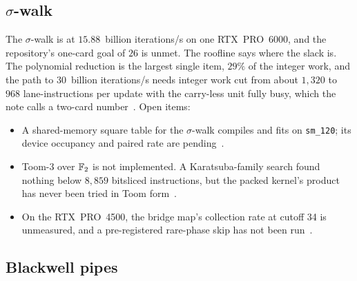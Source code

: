 \subsection{$\sigma$-walk}
\label{sec:open-sigma}

The $\sigma$-walk is at $15.88$~billion iterations/s on one RTX~PRO~6000,
and the repository's one-card goal of $26$ is unmet. The roofline says
where the slack is. The polynomial reduction is the largest single
item, $29\%$ of the integer work, and the path to $30$~billion
iterations/s needs integer work cut from about $1{,}320$ to $968$
lane-instructions per update with the carry-less unit fully busy,
which the note calls a two-card number~.
Open items:
\begin{itemize}[leftmargin=1.2em,itemsep=0.2em]
\item A shared-memory square table for the $\sigma$-walk compiles and
  fits on \texttt{sm\_120}; its device occupancy and paired rate are
  pending~.
\item Toom-3 over $\mathbb{F}_2$ is not implemented. A Karatsuba-family search
  found nothing below $8{,}859$ bitsliced instructions, but the packed
  kernel's product has never been tried in Toom form~.
\item On the RTX~PRO~4500, the bridge map's collection rate at cutoff 34
  is unmeasured, and a pre-registered rare-phase skip has not been
  run~.
\end{itemize}

\subsection{Blackwell pipes}
\label{sec:open-pipes}

